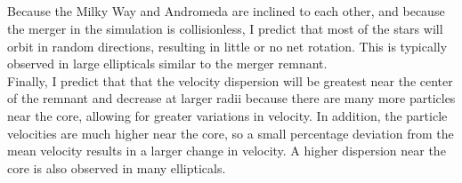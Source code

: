 \documentclass[twocolumn]{aastex63}
\begin{document}
\subsection{}

Because the Milky Way and Andromeda are inclined to each other, and because the merger in the simulation is collisionless, I predict that most of the stars will orbit in random directions, resulting in little or no net rotation. This is typically observed in large ellipticals similar to the merger remnant.\\

Finally, I predict that that the velocity dispersion will be greatest near the center of the remnant and decrease at larger radii because there are many more particles near the core, allowing for greater variations in velocity. In addition, the particle velocities are much higher near the core, so a small percentage deviation from the mean velocity results in a larger change in velocity. A higher dispersion near the core is also observed in many ellipticals.

{}

\end{document}

